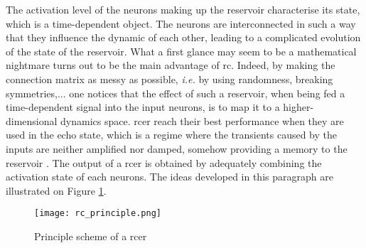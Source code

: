 The activation level of the neurons making up the reservoir characterise its state, which is a time-dependent object. The neurons are interconnected in such a way that they influence the dynamic of each other, leading to a complicated evolution of the state of the reservoir. What a first glance may seem to be a mathematical nightmare turns out to be the main advantage of \gls{rc}. Indeed, by making the connection matrix as messy as possible, \textit{i.e.} by using randomness, breaking symmetries,... one notices that the effect of such a reservoir, when being fed a time-dependent signal into the input neurons, is to map it to a higher-dimensional dynamics space. \gls{rcer} reach their best performance when they are used in the echo state, which is a regime where the transients caused by the inputs are neither amplified nor damped, somehow providing a memory to the reservoir \cite{Goudarzi2014ACS}. The output of a \gls{rcer} is obtained by adequately combining the activation state of each neurons. The ideas developed in this paragraph are illustrated on Figure \ref{rc_principle}.\\

\begin{figure}[h]
	\centering
	\texttt{[image: rc\_principle.png]}
	\caption{Principle scheme of a \acrlong{rcer} \cite{financialTimeSeries}}
	\label{rc_principle}
\end{figure}

